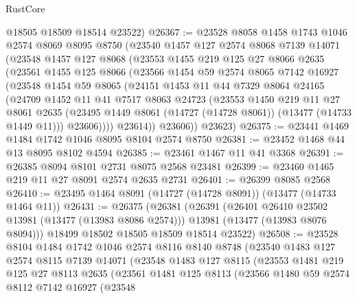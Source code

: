 \begin{lexlean}{RustCore}
\begin{coremodule}
      @18505
      @18509
      @18514
      @23522)
@26367 := @23528
    @8058
    @1458
    @1743
    @1046
    @2574
    @8069
    @8095
    @8750
    (@23540
      @1457
      @127
      @2574
      @8068
      @7139
      @14071
      (@23548
        @1457
        @127
        @8068
        (@23553
          @1455
          @219
          @125
          @27
          @8066
          @2635
          (@23561
            @1455
            @125
            @8066
            (@23566
              @1454
              @59
              @2574
              @8065
              @7142
              @16927
              (@23548
                @1454
                @59
                @8065
                (@24151
                  @1453
                  @11
                  @44
                  @7329
                  @8064
                  @24165
                  (@24709
                    @1452
                    @11
                    @41
                    @7517
                    @8063
                    @24723
                    (@23553
                      @1450
                      @219
                      @11
                      @27
                      @8061
                      @2635
                      (@23495 @1449 @8061 (@14727 (@14728 @8061)) (@13477 (@14733 @1449 @11)))
                      @23606))))
              @23614))
          @23606))
      @23623)
@26375 := @23441 @1469 @1484 @1742 @1046 @8095 @8104 @2574 @8750
@26381 := @23452 @1468 @44 @13 @8095 @8102 @4594
@26385 := @23461 @1467 @11 @41 @3368
@26391 := @26385 @8094 @8101 @2731 @8075 @2568 @23481
@26399 := @23460 @1465 @219 @11 @27 @8091 @2574 @2635 @2731
@26401 := @26399 @8085 @2568
@26410 := @23495 @1464 @8091 (@14727 (@14728 @8091)) (@13477 (@14733 @1464 @11))
@26431 := @26375
    (@26381
      (@26391
        (@26401 @26410 @23502 @13981 (@13477 (@13983 @8086 @2574)))
        @13981
        (@13477 (@13983 @8076 @8094)))
      @18499
      @18502
      @18505
      @18509
      @18514
      @23522)
@26508 := @23528
    @8104
    @1484
    @1742
    @1046
    @2574
    @8116
    @8140
    @8748
    (@23540
      @1483
      @127
      @2574
      @8115
      @7139
      @14071
      (@23548
        @1483
        @127
        @8115
        (@23553
          @1481
          @219
          @125
          @27
          @8113
          @2635
          (@23561
            @1481
            @125
            @8113
            (@23566
              @1480
              @59
              @2574
              @8112
              @7142
              @16927
              (@23548

\end{coremodule}
\end{lexlean}
